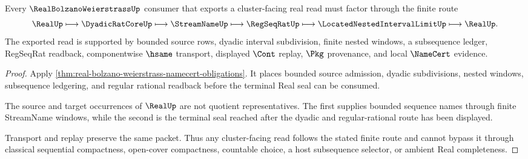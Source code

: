 \begin{theorem}
\label{thm:real-bolzano-weierstrass-subsequence-readback-route}
Every $\RealBolzanoWeierstrassUp$ consumer that exports a cluster-facing real read must factor through the finite route
$$
\RealUp \longmapsto \DyadicRatCoreUp \longmapsto \StreamNameUp \longmapsto \RegSeqRatUp \longmapsto \LocatedNestedIntervalLimitUp \longmapsto \RealUp .
$$
The exported read is supported by bounded source rows, dyadic interval subdivision, finite nested windows, a subsequence ledger, RegSeqRat readback, componentwise $\hsame$ transport, displayed $\Cont$ replay, $\Pkg$ provenance, and local $\NameCert$ evidence.
\end{theorem}
\begin{proof}
Apply \autoref{thm:real-bolzano-weierstrass-namecert-obligations}. It places bounded source admission, dyadic subdivisions, nested windows, subsequence ledgering, and regular rational readback before the terminal Real seal can be consumed.

The source and target occurrences of $\RealUp$ are not quotient representatives. The first supplies bounded sequence names through finite StreamName windows, while the second is the terminal seal reached after the dyadic and regular-rational route has been displayed.

Transport and replay preserve the same packet. Thus any cluster-facing read follows the stated finite route and cannot bypass it through classical sequential compactness, open-cover compactness, countable choice, a host subsequence selector, or ambient Real completeness.
\end{proof}




